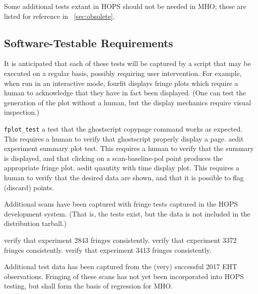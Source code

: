 Some additional tests extant in \ac{HOPS} should not be needed in
\ac{MHO}; these are listed for reference in \App~\ref{sec:obsolete}.

\subsection{Software-Testable Requirements}
\label{sec:regress}

It is anticipated that each of these tests will be captured by a
script that may be executed on a regular basis, possibly requiring
user intervention.  For example, when run in an interactive mode,
\ac{fourfit} displays fringe plots which require a human to acknowledge
that they have in fact been displayed.  (One can test the generation of
the plot without a human, but the display mechanics require visual
inspection.)

\begin{description}
 \texttt{fplot\_test} a test that the \ac{ghostscript} copypage
    command works as expected.  This requires a human to verify that
    \ac{ghostscript} properly display a page.
 \ac{aedit} experiment summary plot test.  This requires a
    human to verify that the summary is displayed, and that clicking
    on a scan-baseline-pol point produces the appropriate fringe plot.
 \ac{aedit} quantity with time display plot.  This requires
    a human to verify that the desired data are shown, and that it
    is possible to flag (discard) points.
 
\end{description}

Additional scans have been captured with fringe tests captured
in the \ac{HOPS} development system.  (That is, the tests exist,
but the data is not included in the distribution tarball.)

\begin{description}
 verify that experiment 2843 fringes consistently.
 verify that experiment 3372 fringes consistently.
 verify that experiment 3413 fringes consistently.
\end{description}

Additional test data has been captured from the (very) successful
2017 \ac{EHT} observations.  Fringing of these scans has not yet
been incorporated into \ac{HOPS} testing, but shall form the basis
of regression for \ac{MHO}.  \FIXME[elaborate]

